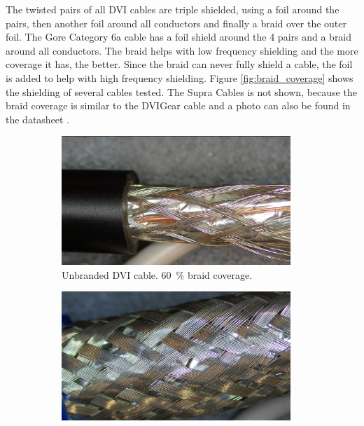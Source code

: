 The twisted pairs of all DVI cables are triple shielded, using a foil around the pairs, then another foil around all conductors and finally a braid over the outer foil. The Gore Category 6a cable has a foil shield around the 4 pairs and a braid around all conductors. The braid helps with low frequency shielding and the more coverage it has, the better. Since the braid can never fully shield a cable, the foil is added to help with high frequency shielding. Figure \ref{fig:braid_coverage} shows the shielding of several cables tested. The Supra Cables  is not shown, because the braid coverage is similar to the DVIGear cable and a photo can also be found in the datasheet \cite{supra_dvi_cable}.
\begin{figure}[ht]
    \centering
    \begin{subfigure}[t]{0.45\linewidth}
        \centering
        \includegraphics[width=0.95\textwidth]{images/braid_coverage/14-39-55.jpg}
        \caption{Unbranded DVI cable. \qty{60}{\percent} braid coverage.}
        \label{fig:braid_coverage_unknown}
    \end{subfigure}
    \begin{subfigure}[t]{0.45\linewidth}
        \centering
        \includegraphics[width=0.95\textwidth]{images/braid_coverage/14-37-27.jpg}

\end{subfigure}
\end{figure}
